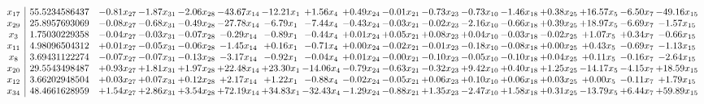 \documentclass[9pt]{article}
\begin{document}
 \[\begin{array}{c| c c@{\hskip 2pt} c@{\hskip 2pt} c@{\hskip 2pt} c@{\hskip 2pt} c@{\hskip 2pt} c@{\hskip 2pt} c@{\hskip 2pt} c@{\hskip 2pt} c@{\hskip 2pt} c@{\hskip 2pt} c@{\hskip 2pt} c@{\hskip 2pt} c@{\hskip 2pt} c@{\hskip 2pt} c@{\hskip 2pt} }
 x_{17}   &  55.5234586437 & -0.81 x_{27} & -1.87 x_{31} & -2.06 x_{28} & -43.67 x_{14} & -12.21 x_{1} & +  1.56 x_{4} & +  0.49 x_{24} & -0.01 x_{21} & -0.73 x_{23} & -0.73 x_{10} & -1.46 x_{18} & +  0.38 x_{25} & + 16.57 x_{5} & -6.50 x_{7} & -49.16 x_{15}\\
 x_{29}   &  25.8957693069 & -0.08 x_{27} & -0.68 x_{31} & -0.49 x_{28} & -27.78 x_{14} & -6.79 x_{1} & -7.44 x_{4} & -0.43 x_{24} & -0.03 x_{21} & -0.02 x_{23} & -2.16 x_{10} & -0.66 x_{18} & +  0.39 x_{25} & + 18.97 x_{5} & -6.69 x_{7} & -1.57 x_{15}\\
 x_{3}   &  1.75030229358 & -0.04 x_{27} & -0.03 x_{31} & -0.07 x_{28} & -0.29 x_{14} & -0.89 x_{1} & -0.44 x_{4} & +  0.01 x_{24} & +  0.05 x_{21} & +  0.08 x_{23} & +  0.04 x_{10} & -0.03 x_{18} & -0.02 x_{25} & +  1.07 x_{5} & +  0.34 x_{7} & -0.66 x_{15}\\
 x_{11}   &  4.98096504312 & +  0.01 x_{27} & -0.05 x_{31} & -0.06 x_{28} & -1.45 x_{14} & +  0.16 x_{1} & -0.71 x_{4} & +  0.00 x_{24} & -0.02 x_{21} & -0.01 x_{23} & -0.18 x_{10} & -0.08 x_{18} & +  0.00 x_{25} & +  0.43 x_{5} & -0.69 x_{7} & -1.13 x_{15}\\
 x_{8}   &  3.69431122274 & -0.07 x_{27} & -0.07 x_{31} & -0.13 x_{28} & -3.17 x_{14} & -0.92 x_{1} & -0.04 x_{4} & +  0.01 x_{24} & -0.00 x_{21} & -0.10 x_{23} & -0.05 x_{10} & -0.10 x_{18} & +  0.04 x_{25} & +  0.11 x_{5} & -0.16 x_{7} & -2.64 x_{15}\\
 x_{20}   &  29.5543498487 & +  0.93 x_{27} & +  1.81 x_{31} & +  1.97 x_{28} & + 22.48 x_{14} & + 23.30 x_{1} & -14.06 x_{4} & -0.79 x_{24} & -0.63 x_{21} & -0.32 x_{23} & +  9.42 x_{10} & +  0.40 x_{18} & +  1.25 x_{25} & -14.17 x_{5} & -4.15 x_{7} & + 18.59 x_{15}\\
 x_{12}   &  3.66202948504 & +  0.03 x_{27} & +  0.07 x_{31} & +  0.12 x_{28} & +  2.17 x_{14} & +  1.22 x_{1} & -0.88 x_{4} & -0.02 x_{24} & -0.05 x_{21} & +  0.06 x_{23} & +  0.10 x_{10} & +  0.06 x_{18} & +  0.03 x_{25} & +  0.00 x_{5} & -0.11 x_{7} & +  1.79 x_{15}\\
 x_{34}   &  48.4661628959 & +  1.54 x_{27} & +  2.86 x_{31} & +  3.54 x_{28} & + 72.19 x_{14} & + 34.83 x_{1} & -32.43 x_{4} & -1.29 x_{24} & -0.88 x_{21} & +  1.35 x_{23} & -2.47 x_{10} & +  1.58 x_{18} & +  0.31 x_{25} & -13.79 x_{5} & +  6.44 x_{7} & + 59.89 x_{15}\\

\end{array}\]
\end{document}
